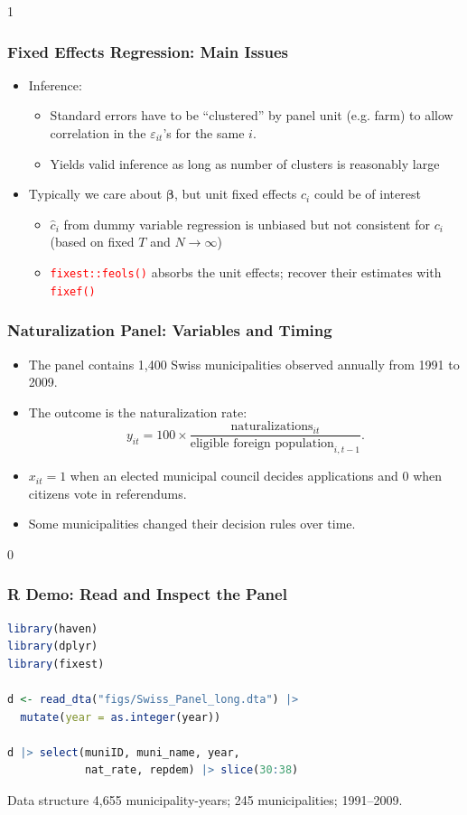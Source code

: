 \documentclass[xcolor=svgnames,9pt,english, aspectratio=169]{beamer}
\newcommand{\red}{\textcolor{red}}
\newcommand{\solutions}{0}
\newcommand{\bs}{\boldsymbol}
\renewcommand{\b}{\ensuremath{\bs{\beta}}}
\begin{document}
\if\solutions1
\begin{frame}
  \frametitle{Fixed Effects Regression: Main Issues}
  \small
\begin{itemize}[<+->]
  \item Inference:
  \begin{itemize}
    \item Standard errors have to be ``clustered'' by panel unit (e.g. farm) to allow correlation in the
$\varepsilon_{it}$'s for the same $i$.\medskip
\item Yields valid inference as long as number of clusters is reasonably large
\end{itemize}\bigskip
\item Typically we care about $\b$, but unit fixed effects $c_i$ could be of interest
    \begin{itemize}
     \item  $\widehat c_{i}$ from dummy variable regression is unbiased but not consistent for $c_i$ (based on fixed $T$ and $N \rightarrow \infty $)\medskip
     \item \red{\texttt{fixest::feols()}} absorbs the unit effects; recover their estimates with \red{\texttt{fixef()}}
\end{itemize}
\end{itemize}
\end{frame}
\fi


\begin{frame}
  \frametitle{Naturalization Panel: Variables and Timing}
\small
\begin{itemize}\itemsep0.8em
\item The panel contains 1,400 Swiss municipalities observed annually from 1991 to 2009.
\item The outcome is the naturalization rate:
\[
y_{it}=100\times
\frac{\text{naturalizations}_{it}}
{\text{eligible foreign population}_{i,t-1}}.
\]
\item $x_{it}=1$ when an elected municipal council decides applications and $0$ when citizens vote in referendums.
\item Some municipalities changed their decision rules over time.
\end{itemize}
\end{frame}


\if\solutions0
\begin{frame}[fragile]
  \frametitle{R Demo: Read and Inspect the Panel}
\begin{lstlisting}[language=R]
library(haven)
library(dplyr)
library(fixest)

d <- read_dta("figs/Swiss_Panel_long.dta") |>
  mutate(year = as.integer(year))

d |> select(muniID, muni_name, year,
            nat_rate, repdem) |> slice(30:38)
\end{lstlisting}
\begin{block}{Data structure}
4,655 municipality-years; 245 municipalities; 1991--2009.
\end{block}
\end{frame}
\fi
\end{document}
